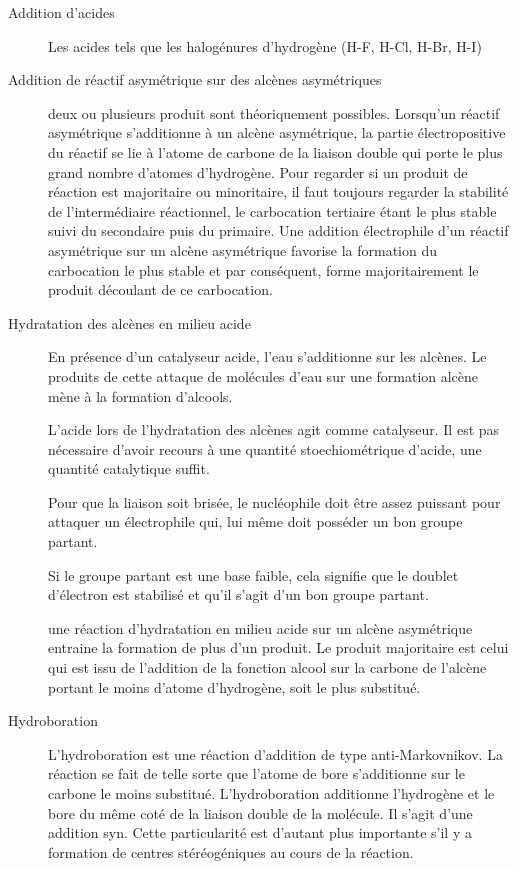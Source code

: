 \begin{description}
  \item[Addition d'acides]

    Les acides tels que les halogénures d'hydrogène (H-F, H-Cl, H-Br, H-I)
  \item[Addition de réactif asymétrique sur des alcènes asymétriques]
    deux ou plusieurs produit sont théoriquement possibles.
    Lorsqu'un réactif asymétrique s'additionne à un alcène asymétrique, la partie électropositive du réactif se lie à l'atome de carbone de la liaison double qui porte le plus grand nombre d'atomes d'hydrogène.
    Pour regarder si un produit de réaction est majoritaire ou minoritaire, il faut toujours regarder la stabilité de l'intermédiaire réactionnel, le carbocation tertiaire étant le plus stable suivi du secondaire puis du primaire.
    Une addition électrophile d'un réactif asymétrique sur un alcène asymétrique favorise la formation du carbocation le plus stable et par conséquent, forme majoritairement le produit découlant de ce carbocation.
  \item[Hydratation des alcènes en milieu acide]

    En présence d'un catalyseur acide, l'eau s'additionne sur les alcènes.
    Le produits de cette attaque de molécules d'eau sur une formation alcène mène à la formation d'alcools.

    L'acide lors de l'hydratation des alcènes agit comme catalyseur.
    Il est pas nécessaire d'avoir recours à une quantité stoechiométrique d'acide, une quantité catalytique suffit.

    Pour que la liaison soit brisée, le nucléophile doit être assez puissant pour attaquer un électrophile qui, lui même doit posséder un bon groupe partant.

    Si le groupe partant est une base faible, cela signifie que le doublet d'électron est stabilisé et qu'il s'agit d'un bon groupe partant.

    une réaction d'hydratation en milieu acide sur un alcène asymétrique entraine la formation de plus d'un produit.
    Le produit majoritaire est celui qui est issu de l'addition de la fonction alcool sur la carbone de l'alcène portant le moins d'atome d'hydrogène, soit le plus substitué.

  \item[Hydroboration]
    L'hydroboration est une réaction d'addition de type anti-Markovnikov.
    La réaction se fait de telle sorte que l'atome de bore s'additionne sur le carbone le moins substitué.
    L'hydroboration additionne l'hydrogène et le bore du même coté de la liaison double de la molécule.
    Il s'agit d'une addition syn.
    Cette particularité est d'autant plus importante s'il y a formation de centres stéréogéniques au cours de la réaction.


\end{description}
